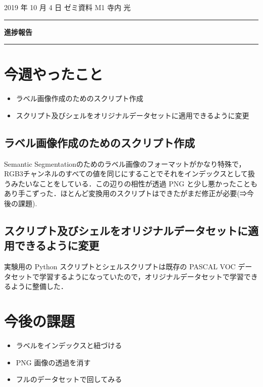 \documentclass[onecolumn]{ujarticle}   %
\begin{document}
	
	\noindent
	
	\hspace{1em}
	2019 年 10 月 4 日
	ゼミ資料
	\hfill
	M1 寺内 光
	
	\vspace{2mm}
	
	\hrule
	
	\begin{center}
		{\Large \bf 進捗報告}
	\end{center}
	
	
	\hrule
	\vspace{3mm}
	
	\section{今週やったこと}
	\begin{itemize}
		\item ラベル画像作成のためのスクリプト作成
		\item スクリプト及びシェルをオリジナルデータセットに適用できるように変更
	\end{itemize}
	
	\subsection{ラベル画像作成のためのスクリプト作成}
	Semantic Segmentationのためのラベル画像のフォーマットがかなり特殊で，RGB3チャンネルのすべての値を同じにすることでそれをインデックスとして扱うみたいなことをしている．この辺りの相性が透過 PNG と少し悪かったこともあり手こずった．ほとんど変換用のスクリプトはできたがまだ修正が必要(⇒今後の課題).
	
	\subsection{スクリプト及びシェルをオリジナルデータセットに適用できるように変更}
	実験用の Python スクリプトとシェルスクリプトは既存の PASCAL VOC データセットで学習するようになっていたので，オリジナルデータセットで学習できるように整備した．

	\section{今後の課題}
	\begin{itemize}
		\item ラベルをインデックスと紐づける
		\item PNG 画像の透過を消す
		\item フルのデータセットで回してみる
	\end{itemize}
\end{document}

